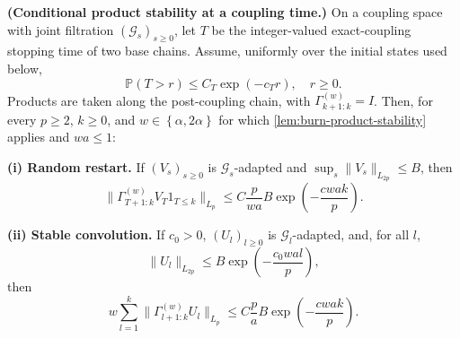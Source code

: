\begin{lemma}\label{lem:burn-random-time-product}
  \textbf{(Conditional product stability at a coupling time.)}
  On a coupling space with joint filtration $(\mathcal{G}_{s})_{s \ge 0}$, let $T$ be
  the integer-valued exact-coupling stopping time of two base chains. Assume,
  uniformly over the initial states used below,
  \begin{equation}
\mathbb{P}(T > r) \le C_{T} \exp\left(-c_{T} r\right),
  \quad r \ge 0.
\label{eq:coupling-time-tail}
\end{equation}
  Products are taken along the post-coupling chain, with
  $\Gamma_{k + 1:k}^{(w)} = I$. Then, for every $p \ge 2$, $k \ge 0$, and
  $w \in \left\{ \alpha, 2 \alpha \right\}$ for which \cref{lem:burn-product-stability} applies and
  $w a \le 1$:

  \textbf{(i) Random restart.} If $(V_{s})_{s \ge 0}$ is $\mathcal{G}_{s}$-adapted and
  $\sup_{s} \lVert V_{s} \rVert_{L_{2p}} \le B$, then
  \begin{equation}
\lVert \Gamma_{T + 1:k}^{(w)} V_{T} 1_{T \le k} \rVert_{L_{p}}
    \le C \frac{p}{w a} B
       \exp\left(- \frac{c w a k}{p}\right).
\label{eq:burn-random-time-product}
\end{equation}

  \textbf{(ii) Stable convolution.} If $c_{0} > 0$, $(U_{l})_{l \ge 0}$ is
  $\mathcal{G}_{l}$-adapted, and, for all $l$,
  \[
\lVert U_{l} \rVert_{L_{2p}}
    \le B \exp\left(- \frac{c_{0} w a l}{p}\right),
\]
  then
  \begin{equation}
w \sum_{l = 1}^{k}
    \lVert \Gamma_{l + 1:k}^{(w)} U_{l} \rVert_{L_{p}}
    \le C \frac{p}{a} B
       \exp\left(- \frac{c w a k}{p}\right).
\label{eq:burn-stable-convolution}
\end{equation}
\end{lemma}

